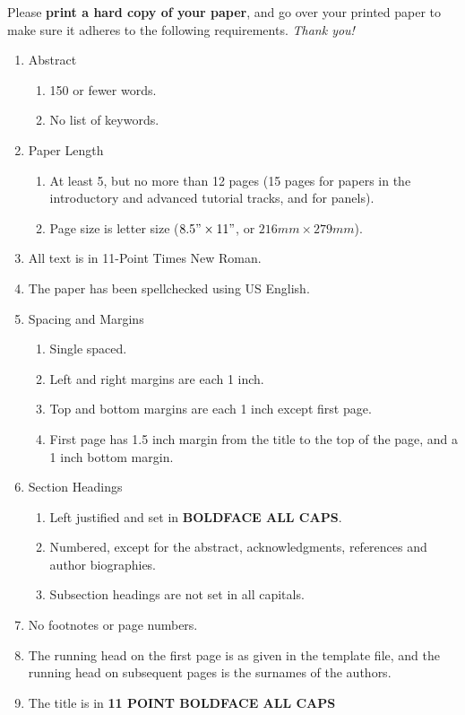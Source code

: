 \documentclass{wscpaperproc}
\theoremstyle{wsc}
\begin{document}
Please {\bf print a hard copy of your paper}, and go over your printed paper to make sure it adheres to the following requirements. {\em Thank you!}
\begin{enumerate}
	\item Abstract
	\begin{enumerate}
		\item 150 or fewer words.
		\item No list of keywords.
	\end{enumerate}
	\item Paper Length
	\begin{enumerate}
		\item At least 5, but no more than 12 pages (15 pages for papers in the introductory and advanced tutorial tracks, and for panels).
	\item Page size is letter size ($8.5" \times 11"$, or $216 mm \times 279 mm$).
	\end{enumerate}
	\item All text is in 11-Point Times New Roman.
	\item The paper has been spellchecked using US English.
	\item Spacing and Margins
	\begin{enumerate}
		\item Single spaced.
		\item Left and right margins are each 1 inch.
		\item Top and bottom margins are each 1 inch except first page.
		\item First page has 1.5 inch margin from the title to the top of the page, and a 1 inch bottom margin.
	\end{enumerate}
	\item Section Headings
	\begin{enumerate}
		\item Left justified and set in {\bf BOLDFACE ALL CAPS}.
		\item Numbered, except for the abstract, acknowledgments, references and author biographies.
		\item Subsection headings are not set in all capitals.
	\end{enumerate}
	\item No footnotes or page numbers.
	\item The running head on the first page is as given in the template file, and the running head on subsequent pages is the surnames of the authors.
	\item The title is in {\bf 11 POINT BOLDFACE ALL CAPS}

\end{enumerate}
\end{document}

